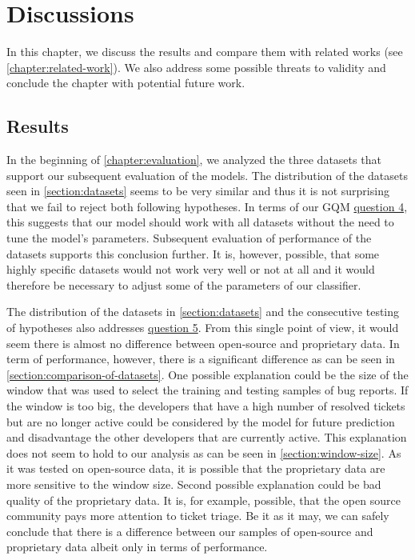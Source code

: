 \chapter{Discussions}

In this chapter, we discuss the results and compare them with related works (see \autoref{chapter:related-work}). We also address some possible threats to validity and conclude the chapter with potential future work.

\section{Results}

In the beginning of \autoref{chapter:evaluation}, we analyzed the three datasets that support our subsequent evaluation of the models. The distribution of the datasets seen in \autoref{section:datasets} seems to be very similar and thus it is not surprising that we fail to reject both following hypotheses. In terms of our GQM \hyperlink{question:4}{question 4}, this suggests that our model should work with all datasets without the need to tune the model's parameters. Subsequent evaluation of performance of the datasets supports this conclusion further. It is, however, possible, that some highly specific datasets would not work very well or not at all and it would therefore be necessary to adjust some of the parameters of our classifier.

The distribution of the datasets in \autoref{section:datasets} and the consecutive testing of hypotheses also addresses \hyperlink{question:5}{question 5}. From this single point of view, it would seem there is almost no difference between open-source and proprietary data. In term of performance, however, there is a significant difference as can be seen in \autoref{section:comparison-of-datasets}. One possible explanation could be the size of the window that was used to select the training and testing samples of bug reports. If the window is too big, the developers that have a high number of resolved tickets but are no longer active could be considered by the model for future prediction and disadvantage the other developers that are currently active. This explanation does not seem to hold to our analysis as can be seen in \autoref{section:window-size}. As it was tested on open-source data, it is possible that the proprietary data are more sensitive to the window size. Second possible explanation could be bad quality of the proprietary data. It is, for example, possible, that the open source community pays more attention to ticket triage. Be it as it may, we can safely conclude that there is a difference between our samples of open-source and proprietary data albeit only in terms of performance.

